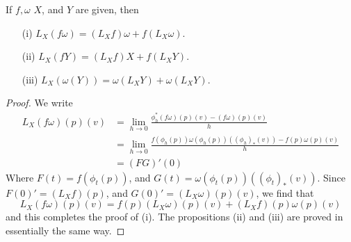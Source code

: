 \begin{theorem}
    If $f, \omega$ $X$, and $Y$ are given, then
    \begin{itemize}
        \item[(i)] $L_X(f \omega) = (L_X f) \omega + f (L_X \omega)$.
        \item[(ii)] $L_X(f Y) = (L_X f) X + f (L_X Y)$.
        \item[(iii)] $L_X(\omega(Y)) = \omega(L_X Y) + \omega(L_X Y)$.
    \end{itemize}
\end{theorem}
\begin{proof}
    We write
    \begin{align*}
        L_X(f \omega)(p)(v) &= \lim_{h \to 0} \frac{\phi_h^*(f \omega)(p)(v) - (f \omega)(p)(v)}{h}\\
        &= \lim_{h \to 0} \frac{f(\phi_h(p)) \omega(\phi_h(p))((\phi_h)_*(v)) - f(p) \omega(p)(v)}{h}\\
        &= (FG)'(0)
    \end{align*}
    Where $F(t) = f(\phi_t(p))$, and $G(t) = \omega(\phi_t(p))((\phi_t)_*(v))$. Since $F(0)' = (L_X f)(p)$, and $G(0)' = (L_X \omega)(p)(v)$, we find that
    \[ L_X(f \omega)(p)(v) = f(p) (L_X \omega)(p)(v) + (L_X f)(p) \omega(p)(v) \]
    and this completes the proof of (i). The propositions (ii) and (iii) are proved in essentially the same way.
\end{proof}

